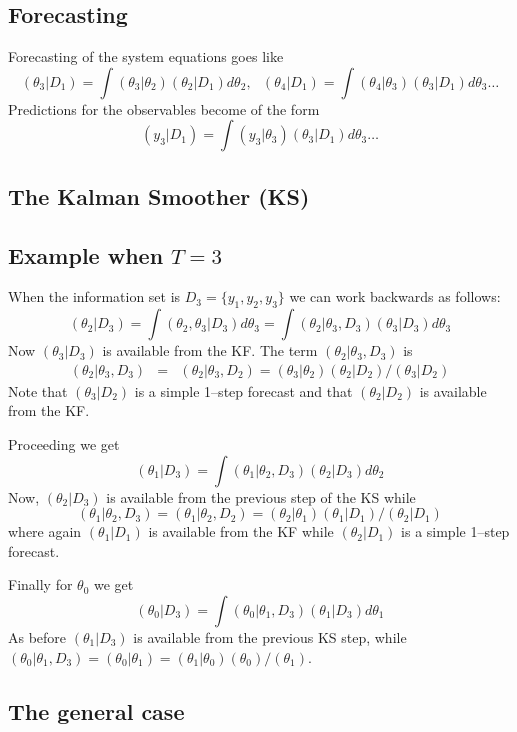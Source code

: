 \subsection{Forecasting}

Forecasting of the system equations goes like
$$
(\theta_3|D_1)=\int(\theta_3|\theta_2)(\theta_2|D_1)d\theta_2,\ \ \
(\theta_4|D_1)=\int(\theta_4|\theta_3)(\theta_3|D_1)d\theta_3 \dots
$$
Predictions for the observables become of the form
$$
(y_3|D_1) = \int(y_3|\theta_3)(\theta_3|D_1)d\theta_3 \dots
$$


\subsection{The Kalman Smoother (KS)}


\subsection{Example when $T=3$}

When the information set is $D_3=\{y_1,y_2,y_3\}$ we can work backwards as
follows:
$$
(\theta_2|D_3)=\int (\theta_2,\theta_3|D_3)d\theta_3 = 
\int (\theta_2|\theta_3,D_3)(\theta_3|D_3)d\theta_3 
$$
Now $(\theta_3|D_3)$ is available from the KF. The term
$(\theta_2|\theta_3,D_3)$ is
\begin{eqnarray*}
  (\theta_2|\theta_3,D_3) &=& (\theta_2|\theta_3,D_2)
  = (\theta_3|\theta_2)(\theta_2|D_2) / (\theta_3|D_2)
\end{eqnarray*}
Note that $(\theta_3|D_2)$ is a simple 1--step forecast and that
$(\theta_2|D_2)$ is available from the KF.

Proceeding we get
$$
(\theta_1|D_3) = \int (\theta_1|\theta_2,D_3)(\theta_2|D_3) d\theta_2
$$
Now, $(\theta_2|D_3)$ is available from the previous step of the KS while
$$
(\theta_1|\theta_2,D_3) = (\theta_1|\theta_2,D_2) =
(\theta_2|\theta_1)(\theta_1|D_1)/(\theta_2|D_1)
$$
where again $(\theta_1|D_1)$ is available from the KF while $(\theta_2|D_1)$ is
a simple 1--step forecast.

Finally for $\theta_0$ we get
$$
(\theta_0|D_3)=\int (\theta_0|\theta_1,D_3)(\theta_1|D_3)d\theta_1
$$
As before $(\theta_1|D_3)$ is available from the previous KS step, while 
$(\theta_0|\theta_1,D_3)=(\theta_0|\theta_1) =
(\theta_1|\theta_0)(\theta_0)/(\theta_1)$. 

\subsection{The general case}

